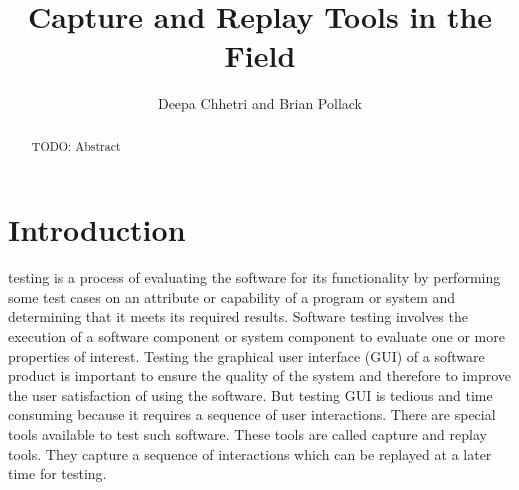 \documentclass[12pt,journal]{IEEEtran}
\begin{document}
\title{Capture and Replay Tools in the Field}
\author{Deepa Chhetri and Brian Pollack}
\maketitle

\begin{abstract}
TODO: Abstract
\end{abstract}

\section{Introduction}

 testing is a process of  evaluating the software for its functionality by performing some test cases on an attribute or capability of a program or system and determining that it meets its required results. Software testing involves the execution of a software component or system component to evaluate one or more properties of interest. Testing the graphical user interface (GUI) of a software product is important to ensure the quality of the system and therefore to improve the user satisfaction of using the software\cite{Nedyalkova:2013:OSC:2494444.2494464}. But testing GUI is tedious and time consuming because it requires a sequence of user interactions. There are special tools available to test such software. These tools are called capture and replay tools. They capture a sequence of interactions which can be replayed at a later time for testing.
\end{document}
